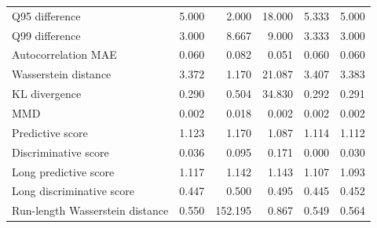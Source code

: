 \documentclass[make,article,submit,moreauthors]{Definitions/mdpi}
\begin{document}
\begin{center}
\begin{longtable}{@{}lrrrrr@{}}
Q95 difference & 5.000 & 2.000 & 18.000 & 5.333 & 5.000 \\
Q99 difference & 3.000 & 8.667 & 9.000 & 3.333 & 3.000 \\
Autocorrelation MAE & 0.060 & 0.082 & 0.051 & 0.060 & 0.060 \\
Wasserstein distance & 3.372 & 1.170 & 21.087 & 3.407 & 3.383 \\
KL divergence & 0.290 & 0.504 & 34.830 & 0.292 & 0.291 \\
MMD & 0.002 & 0.018 & 0.002 & 0.002 & 0.002 \\
Predictive score & 1.123 & 1.170 & 1.087 & 1.114 & 1.112 \\
Discriminative score & 0.036 & 0.095 & 0.171 & 0.000 & 0.030 \\
Long predictive score & 1.117 & 1.142 & 1.143 & 1.107 & 1.093 \\
Long discriminative score & 0.447 & 0.500 & 0.495 & 0.445 & 0.452 \\
Run-length Wasserstein distance & 0.550 & 152.195 & 0.867 & 0.549 & 0.564 \\
\end{longtable}
\end{center}
\end{document}
